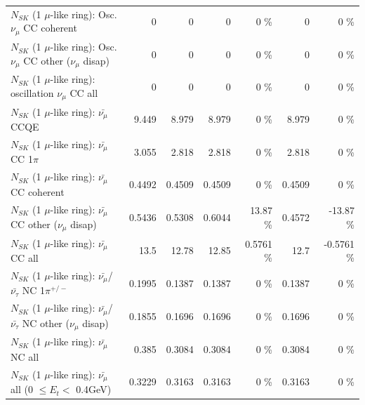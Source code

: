 \begin{table}
\begin{tabular}{| l | r | r | r  r | r  r |}
                        $N_{SK}$ (1 $\mu$-like ring): Osc. $\nu_\mu$ CC coherent &               0 &               0 &               0 &        0 \%  &               0 &        0 \%  \\ 
         $N_{SK}$ (1 $\mu$-like ring): Osc. $\nu_\mu$ CC other ($\nu_\mu$ disap) &               0 &               0 &               0 &        0 \%  &               0 &        0 \%  \\ 
                      $N_{SK}$ (1 $\mu$-like ring): oscillation $\nu_\mu$ CC all &               0 &               0 &               0 &        0 \%  &               0 &        0 \%  \\ 
\hline
\hline
                              $N_{SK}$ (1 $\mu$-like ring): $\bar{\nu_\mu}$ CCQE &           9.449 &           8.979 &           8.979 &        0 \%  &           8.979 &        0 \%  \\ 
                         $N_{SK}$ (1 $\mu$-like ring): $\bar{\nu_\mu}$ CC 1$\pi$ &           3.055 &           2.818 &           2.818 &        0 \%  &           2.818 &        0 \%  \\ 
                       $N_{SK}$ (1 $\mu$-like ring): $\bar{\nu_\mu}$ CC coherent &          0.4492 &          0.4509 &          0.4509 &        0 \%  &          0.4509 &        0 \%  \\ 
        $N_{SK}$ (1 $\mu$-like ring): $\bar{\nu_\mu}$ CC other ($\nu_\mu$ disap) &          0.5436 &          0.5308 &          0.6044 &    13.87 \%  &          0.4572 &   -13.87 \%  \\ 
                          $N_{SK}$ (1 $\mu$-like ring): $\bar{\nu_{\mu}}$ CC all &            13.5 &           12.78 &           12.85 &   0.5761 \%  &            12.7 &  -0.5761 \%  \\ 
\hline
  $N_{SK}$ (1 $\mu$-like ring): $\bar{\nu_\mu}$/$\bar{\nu_\tau}$ NC 1$\pi^{+/-}$ &          0.1995 &          0.1387 &          0.1387 &        0 \%  &          0.1387 &        0 \%  \\ 
$N_{SK}$ (1 $\mu$-like ring): $\bar{\nu_\mu}$/$\bar{\nu_\tau}$ NC other ($\nu_\mu$ disap) &          0.1855 &          0.1696 &          0.1696 &        0 \%  &          0.1696 &        0 \%  \\ 
                          $N_{SK}$ (1 $\mu$-like ring): $\bar{\nu_{\mu}}$ NC all &           0.385 &          0.3084 &          0.3084 &        0 \%  &          0.3084 &        0 \%  \\ 
\hline
   $N_{SK}$ (1 $\mu$-like ring): $\bar{\nu_{\mu}}$ all (0 $\leq E_{t} <$ 0.4GeV) &          0.3229 &          0.3163 &          0.3163 &        0 \%  &          0.3163 &        0 \%  \\ 

\end{tabular}
\end{table}
